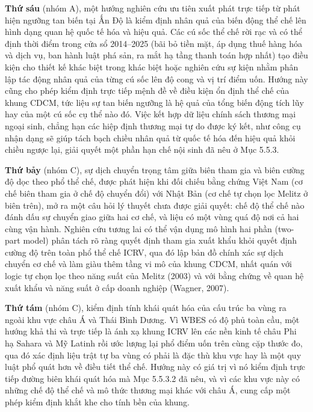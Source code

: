 \documentclass[
  a4paper,
  13pt]{extreport}
\begin{document}
\textbf{Thứ sáu} (nhóm A), một hướng nghiên cứu ưu tiên xuất phát trực
tiếp từ phát hiện ngưỡng tan biến tại Ấn Độ là kiểm định nhân quả của
biến động thể chế lên hình dạng quan hệ quốc tế hóa và hiệu quả. Các cú
sốc thể chế rời rạc và có thể định thời điểm trong cửa sổ 2014--2025
(bãi bỏ tiền mặt, áp dụng thuế hàng hóa và dịch vụ, ban hành luật phá
sản, ra mắt hạ tầng thanh toán hợp nhất) tạo điều kiện cho thiết kế khác
biệt trong khác biệt hoặc nghiên cứu sự kiện nhằm phân lập tác động nhân
quả của từng cú sốc lên độ cong và vị trí điểm uốn. Hướng này cũng cho
phép kiểm định trực tiếp mệnh đề về điều kiện ổn định thể chế của khung
CDCM, tức liệu sự tan biến ngưỡng là hệ quả của tổng biến động tích lũy
hay của một cú sốc cụ thể nào đó. Việc kết hợp dữ liệu chính sách thương
mại ngoại sinh, chẳng hạn các hiệp định thương mại tự do được ký kết,
như công cụ nhận dạng sẽ giúp tách bạch chiều nhân quả từ quốc tế hóa
đến hiệu quả khỏi chiều ngược lại, giải quyết một phần hạn chế nội sinh
đã nêu ở Mục 5.5.3.

\textbf{Thứ bảy} (nhóm C), sự dịch chuyển trọng tâm giữa biên tham gia
và biên cường độ dọc theo phổ thể chế, được phát hiện khi đối chiếu bằng
chứng Việt Nam (cơ chế biên tham gia ở chế độ chuyển đổi) với Nhật Bản
(cơ chế tự chọn lọc Melitz ở biên trên), mở ra một câu hỏi lý thuyết
chưa được giải quyết: chế độ thể chế nào đánh dấu sự chuyển giao giữa
hai cơ chế, và liệu có một vùng quá độ nơi cả hai cùng vận hành. Nghiên
cứu tương lai có thể vận dụng mô hình hai phần (two-part model) phân
tách rõ ràng quyết định tham gia xuất khẩu khỏi quyết định cường độ trên
toàn phổ thể chế ICRV, qua đó lập bản đồ chính xác sự dịch chuyển cơ chế
và làm giàu thêm tầng vi mô của khung CDCM, nhất quán với logic tự chọn
lọc theo năng suất của Melitz (2003) và với bằng chứng về quan hệ xuất
khẩu và năng suất ở cấp doanh nghiệp (Wagner, 2007).

\textbf{Thứ tám} (nhóm C), kiểm định tính khái quát hóa của cấu trúc ba
vùng ra ngoài khu vực châu Á và Thái Bình Dương. Vì WBES có độ phủ toàn
cầu, một hướng khả thi và trực tiếp là ánh xạ khung ICRV lên các nền
kinh tế châu Phi hạ Sahara và Mỹ Latinh rồi ước lượng lại phổ điểm uốn
trên cùng cặp thước đo, qua đó xác định liệu trật tự ba vùng có phải là
đặc thù khu vực hay là một quy luật phổ quát hơn về điều tiết thể chế.
Hướng này có giá trị vì nó kiểm định trực tiếp đường biên khái quát hóa
mà Mục 5.5.3.2 đã nêu, và vì các khu vực này có những chế độ thể chế và
mô thức thương mại khác với châu Á, cung cấp một phép kiểm định khắt khe
cho tính bền của khung.
\end{document}
